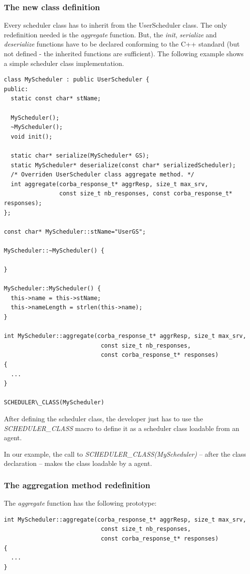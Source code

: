 \subsubsection{The new class definition}
Every scheduler class has to inherit from the UserScheduler class. The only
redefinition needed is the \textit{aggregate} function. But, the \textit{init},
\textit{serialize} and \textit{deserialize} functions have to be declared
conforming to the C++ standard (but not defined - the inherited functions are
sufficient). The following example shows a simple scheduler class
implementation.
\begin{verbatim}
class MyScheduler : public UserScheduler {
public:
  static const char* stName;

  MyScheduler();
  ~MyScheduler();
  void init();

  static char* serialize(MyScheduler* GS);
  static MyScheduler* deserialize(const char* serializedScheduler);
  /* Overriden UserScheduler class aggregate method. */
  int aggregate(corba_response_t* aggrResp, size_t max_srv,
                const size_t nb_responses, const corba_response_t* responses);
};

const char* MyScheduler::stName="UserGS";

MyScheduler::~MyScheduler() {

}

MyScheduler::MyScheduler() {
  this->name = this->stName;
  this->nameLength = strlen(this->name);
}

int MyScheduler::aggregate(corba_response_t* aggrResp, size_t max_srv,
                            const size_t nb_responses,
                            const corba_response_t* responses)
{
  ...
}

SCHEDULER\_CLASS(MyScheduler)
\end{verbatim}
After defining the scheduler class, the developer just has to use the
\textit{SCHEDULER\_CLASS} macro to define it as a scheduler class loadable
from an agent.

In our example, the call to \textit{SCHEDULER\_CLASS(MyScheduler)} --
after the class declaration -- makes the class loadable by a \diet agent.

\subsubsection{The aggregation method redefinition}
The \textit{aggregate} function has the following prototype:
\begin{verbatim}
int MyScheduler::aggregate(corba_response_t* aggrResp, size_t max_srv,
                            const size_t nb_responses,
                            const corba_response_t* responses)
{
  ...
}
\end{verbatim}

